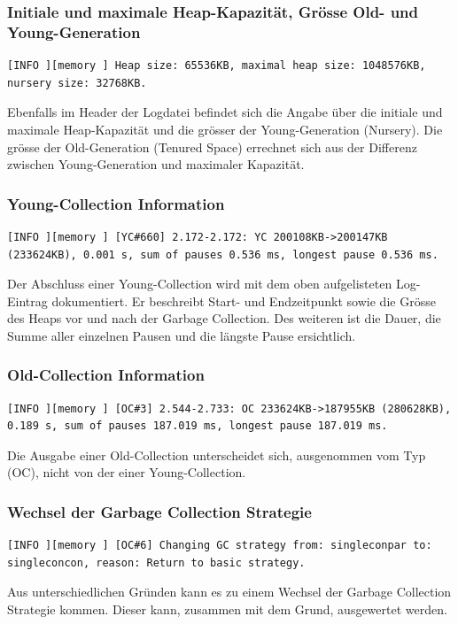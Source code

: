 \subsubsection{Initiale und maximale Heap-Kapazität, Grösse Old- und Young-Generation}
\begin{lstlisting}[numbers=none,  framexleftmargin=0mm, caption=Logdatei: Initiale und maximale Heap-Kapazität und Grösse des Old- und Young-Generation]
[INFO ][memory ] Heap size: 65536KB, maximal heap size: 1048576KB, nursery size: 32768KB.
\end{lstlisting}
Ebenfalls im Header der Logdatei befindet sich die Angabe über die initiale und maximale Heap-Kapazität und die grösser der Young-Generation (Nursery). Die grösse der Old-Generation (Tenured Space) errechnet sich aus der Differenz zwischen Young-Generation und maximaler Kapazität.

\subsubsection{Young-Collection Information}
\begin{lstlisting}[numbers=none,  framexleftmargin=0mm, caption=Logdatei: Information Young-Collection]
[INFO ][memory ] [YC#660] 2.172-2.172: YC 200108KB->200147KB (233624KB), 0.001 s, sum of pauses 0.536 ms, longest pause 0.536 ms.
\end{lstlisting}
Der Abschluss einer Young-Collection wird mit dem oben aufgelisteten Log-Eintrag dokumentiert. Er beschreibt Start- und Endzeitpunkt sowie die Grösse des Heaps vor und nach der Garbage Collection. Des weiteren ist die Dauer, die Summe aller einzelnen Pausen und die längste Pause ersichtlich. 

\subsubsection{Old-Collection Information}
\begin{lstlisting}[numbers=none,  framexleftmargin=0mm, caption=Logdatei: Information Old-Collection]
[INFO ][memory ] [OC#3] 2.544-2.733: OC 233624KB->187955KB (280628KB), 0.189 s, sum of pauses 187.019 ms, longest pause 187.019 ms.
\end{lstlisting}
Die Ausgabe einer Old-Collection unterscheidet sich, ausgenommen vom Typ (OC),  nicht von der einer Young-Collection.

\subsubsection{Wechsel der Garbage Collection Strategie}
\begin{lstlisting}[numbers=none,  framexleftmargin=0mm, caption=Logdatei: Wechsel Garbage Collection Strategie]
[INFO ][memory ] [OC#6] Changing GC strategy from: singleconpar to: singleconcon, reason: Return to basic strategy.
\end{lstlisting}
Aus unterschiedlichen Gründen kann es zu einem Wechsel der Garbage Collection Strategie kommen. Dieser kann, zusammen mit dem Grund, ausgewertet werden.


